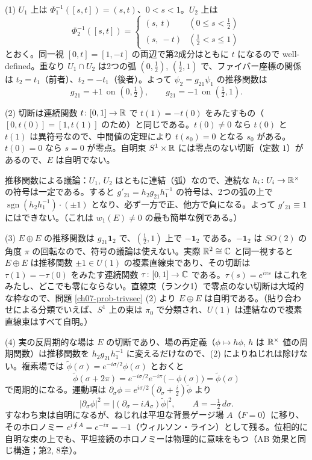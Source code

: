 \begin{solution}
(1) $U_1$ 上は $\Phi_1^{-1}([s,t])=(s,t)$、$0<s<1$。$U_2$ 上は
\[
\Phi_2^{-1}([s,t])=\begin{cases}(s,\ t)&(0\le s<\tfrac12)\\ (s,\ -t)&(\tfrac12<s\le1)\end{cases}
\]
とおく。同一視 $[0,t]=[1,-t]$ の両辺で第2成分はともに $t$ になるので well-defined。重なり $U_1\cap U_2$ は2つの弧 $(0,\tfrac12)$, $(\tfrac12,1)$ で、ファイバー座標の関係は $t_2=t_1$（前者）、$t_2=-t_1$（後者）。よって $\psi_2=g_{21}\psi_1$ の推移関数は
\[
g_{21}=+1\ \ \text{on }(0,\tfrac12),\qquad g_{21}=-1\ \ \text{on }(\tfrac12,1).
\]

(2) 切断は連続関数 $t\colon[0,1]\to\mathbb{R}$ で $t(1)=-t(0)$ をみたすもの（$[0,t(0)]=[1,t(1)]$ のため）と同じである。$t(0)\neq0$ なら $t(0)$ と $t(1)$ は異符号なので、中間値の定理により $t(s_0)=0$ となる $s_0$ がある。$t(0)=0$ なら $s=0$ が零点。自明束 $S^1\times\mathbb{R}$ には零点のない切断（定数 $1$）があるので、$E$ は自明でない。

推移関数による議論：$U_1$, $U_2$ はともに連結（弧）なので、連続な $h_i\colon U_i\to\mathbb{R}^\times$ の符号は一定である。すると $g'_{21}=h_2g_{21}h_1^{-1}$ の符号は、2つの弧の上で $\operatorname{sgn}(h_2h_1^{-1})\cdot(\pm1)$ となり、必ず一方で正、他方で負になる。よって $g'_{21}\equiv1$ にはできない。（これは $w_1(E)\neq0$ の最も簡単な例である。）

(3) $E\oplus E$ の推移関数は $g_{21}\mathbf 1_2$ で、$(\tfrac12,1)$ 上で $-\mathbf 1_2$ である。$-\mathbf 1_2$ は $SO(2)$ の角度 $\pi$ の回転なので、符号の議論は使えない。実際 $\mathbb{R}^2\cong\mathbb{C}$ と同一視すると $E\oplus E$ は推移関数 $\pm1\in U(1)$ の複素直線束であり、その切断は $\tau(1)=-\tau(0)$ をみたす連続関数 $\tau\colon[0,1]\to\mathbb{C}$ である。$\tau(s)=e^{i\pi s}$ はこれをみたし、どこでも零にならない。直線束（ランク1）で零点のない切断は大域的な枠なので、問題 \ref{ch07-prob-trivsec} (2) より $E\oplus E$ は自明である。（貼り合わせによる分類でいえば、$S^1$ 上の束は $\pi_0$ で分類され、$U(1)$ は連結なので複素直線束はすべて自明。）

(4) 実の反周期的な場は $E$ の切断であり、場の再定義（$\phi\mapsto h\phi$, $h$ は $\mathbb{R}^\times$ 値の周期関数）は推移関数を $h_2g_{21}h_1^{-1}$ に変えるだけなので、(2) によりねじれは除けない。複素場では $\tilde\phi(\sigma)=e^{-i\sigma/2}\phi(\sigma)$ とおくと
\[
\tilde\phi(\sigma+2\pi)=e^{-i\sigma/2}e^{-i\pi}\bigl(-\phi(\sigma)\bigr)=\tilde\phi(\sigma)
\]
で周期的になる。運動項は $\partial_\sigma\phi=e^{i\sigma/2}(\partial_\sigma+\tfrac i2)\tilde\phi$ より
\[
\lvert\partial_\sigma\phi\rvert^2=\bigl\lvert(\partial_\sigma-iA_\sigma)\tilde\phi\bigr\rvert^2,\qquad A=-\tfrac12\,d\sigma .
\]
すなわち束は自明になるが、ねじれは平坦な背景ゲージ場 $A$（$F=0$）に移り、そのホロノミー $e^{i\oint A}=e^{-i\pi}=-1$（ウィルソン・ライン）として残る。位相的に自明な束の上でも、平坦接続のホロノミーは物理的に意味をもつ（AB 効果と同じ構造；第2, 8章）。
\end{solution}

